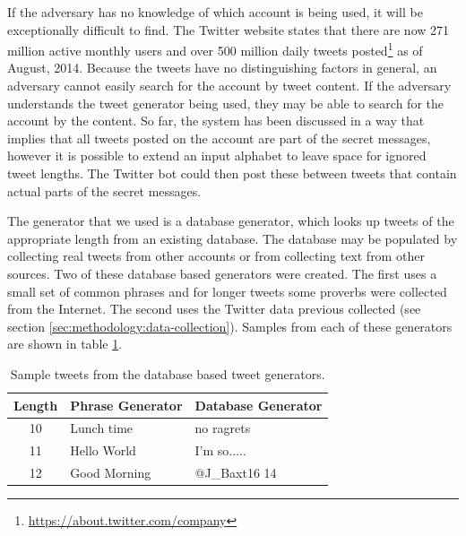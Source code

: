 If the adversary has no knowledge of which account is being used, it will
be exceptionally difficult to find.  The Twitter website
states that there are now 271 million active monthly users and over 500 million
daily tweets
posted\footnote{\url{https://about.twitter.com/company}} as of August, 2014.  Because
the tweets have no distinguishing factors in general, an adversary cannot easily
search for the account by tweet content.  If the adversary understands the
tweet generator being used, they may be able to search for the account by the content.
So far, the system has been discussed in a way that implies that all tweets
posted on the account are part of the secret messages, however it is possible
to extend an input alphabet to leave space for ignored tweet lengths.  The Twitter
bot could then post these between tweets that contain actual parts of the
secret messages.

The generator that we used is a database generator, which looks
up tweets of the appropriate length from an existing database.  The database
may be populated by collecting real tweets from other accounts or from collecting
text from other sources.  Two of these database based generators were created.
The first uses a small set of common phrases and for longer tweets some proverbs
were collected from the Internet.
The second uses the Twitter data previous collected (see section
\ref{sec:methodology:data-collection}).  Samples from each of these generators
are shown in table \ref{tab:evaluation:twittercc:security:db-samples}.

\begin{table}
    \centering
    \begin{tabular}{|c|l|l|}
        \hline
        Length & Phrase Generator & Database Generator \\
        \hline
        10 & Lunch time & no ragrets \\
        \hline
        11 & Hello World & I'm so..... \\
        \hline
        12 & Good Morning & @J\_Baxt16 14 \\
        \hline
    \end{tabular}
    \caption{Sample tweets from the database based tweet generators.}
    \label{tab:evaluation:twittercc:security:db-samples}
\end{table}

